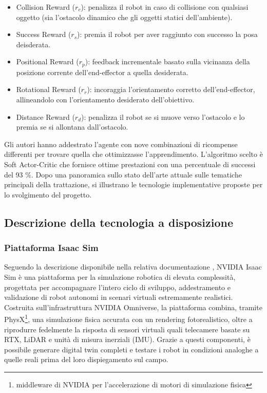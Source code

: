 \begin{itemize}
    \item Collision Reward ($r_c$): penalizza il robot in caso di collisione con qualsiasi oggetto (sia l'ostacolo dinamico che gli oggetti statici dell'ambiente). 
    \item Success Reward ($r_s$): premia il robot per aver raggiunto con successo la posa deisderata.
    \item Positional Reward ($r_p$): feedback incrementale basato sulla vicinanza della posizione corrente dell'end-effector a quella desiderata.
    \item Rotational Reward ($r_r$): incoraggia l'orientamento corretto dell'end-effector, allineandolo con l'orientamento desiderato dell'obiettivo. 
    \item Distance Reward ($r_d$): penalizza il robot se si muove verso l'ostacolo e lo premia se si allontana dall'ostacolo.
\end{itemize}

Gli autori hanno addestrato l'agente con nove combinazioni di ricompense differenti per trovare quella che ottimizzasse l'apprendimento. L'algoritmo scelto è Soft Actor-Critic che fornisce ottime prestazioni con una percentuale di successi del 93 $\%$. Dopo una panoramica sullo stato dell'arte attuale sulle tematiche principali della trattazione, si illustrano le tecnologie implementative proposte per lo svolgimento del progetto.


\subsection{Descrizione della tecnologia a disposizione}

\subsubsection{Piattaforma Isaac Sim}
Seguendo la descrizione disponibile nella relativa documentazione \cite{nvidiaIsaacSim2025}, NVIDIA Isaac Sim è una piattaforma per la simulazione robotica di elevata complessità, progettata per accompagnare l’intero ciclo di sviluppo, addestramento e validazione di robot autonomi in scenari virtuali estremamente realistici. Costruita sull’infrastruttura NVIDIA Omniverse, la piattaforma combina, tramite PhysX\footnote{middleware di NVIDIA per l’accelerazione di motori di simulazione fisica}, una simulazione fisica accurata con un rendering fotorealistico, oltre a riprodurre fedelmente la risposta di sensori virtuali quali telecamere basate su RTX, LiDAR e unità di misura inerziali (IMU). Grazie a questi componenti, è possibile generare digital twin completi e testare i robot in condizioni analoghe a quelle reali prima del loro dispiegamento sul campo.

